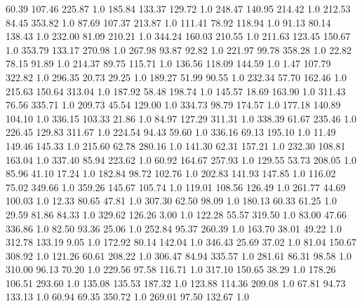      60.39    107.46    225.87  1.0
    185.84    133.37    129.72  1.0
    248.47    140.95    214.42  1.0
    212.53     84.45    353.82  1.0
     87.69    107.37    213.87  1.0
    111.41     78.92    118.94  1.0
     91.13     80.14    138.43  1.0
    232.00     81.09    210.21  1.0
    344.24    160.03    210.55  1.0
    211.63    123.45    150.67  1.0
    353.79    133.17    270.98  1.0
    267.98     93.87     92.82  1.0
    221.97     99.78    358.28  1.0
     22.82     78.15     91.89  1.0
    214.37     89.75    115.71  1.0
    136.56    118.09    144.59  1.0
      1.47    107.79    322.82  1.0
    296.35     20.73     29.25  1.0
    189.27     51.99     90.55  1.0
    232.34     57.70    162.46  1.0
    215.63    150.64    313.04  1.0
    187.92     58.48    198.74  1.0
    145.57     18.69    163.90  1.0
    311.43     76.56    335.71  1.0
    209.73     45.54    129.00  1.0
    334.73     98.79    174.57  1.0
    177.18    140.89    104.10  1.0
    336.15    103.33     21.86  1.0
     84.97    127.29    311.31  1.0
    338.39     61.67    235.46  1.0
    226.45    129.83    311.67  1.0
    224.54     94.43     59.60  1.0
    336.16     69.13    195.10  1.0
     11.49    149.46    145.33  1.0
    215.60     62.78    280.16  1.0
    141.30     62.31    157.21  1.0
    232.30    108.81    163.04  1.0
    337.40     85.94    223.62  1.0
     60.92    164.67    257.93  1.0
    129.55     53.73    208.05  1.0
     85.96     41.10     17.24  1.0
    182.84     98.72    102.76  1.0
    202.83    141.93    147.85  1.0
    116.02     75.02    349.66  1.0
    359.26    145.67    105.74  1.0
    119.01    108.56    126.49  1.0
    261.77     44.69    100.03  1.0
     12.33     80.65     47.81  1.0
    307.30     62.50     98.09  1.0
    180.13     60.33     61.25  1.0
     29.59     81.86     84.33  1.0
    329.62    126.26      3.00  1.0
    122.28     55.57    319.50  1.0
     83.00     47.66    336.86  1.0
     82.50     93.36     25.06  1.0
    252.84     95.37    260.39  1.0
    163.70     38.01     49.22  1.0
    312.78    133.19      9.05  1.0
    172.92     80.14    142.04  1.0
    346.43     25.69     37.02  1.0
     81.04    150.67    308.92  1.0
    121.26     60.61    208.22  1.0
    306.47     84.94    335.57  1.0
    281.61     86.31     98.58  1.0
    310.00     96.13     70.20  1.0
    229.56     97.58    116.71  1.0
    317.10    150.65     38.29  1.0
    178.26    106.51    293.60  1.0
    135.08    135.53    187.32  1.0
    123.88    114.36    209.08  1.0
     67.81     94.73    133.13  1.0
     60.94     69.35    350.72  1.0
    269.01     97.50    132.67  1.0
